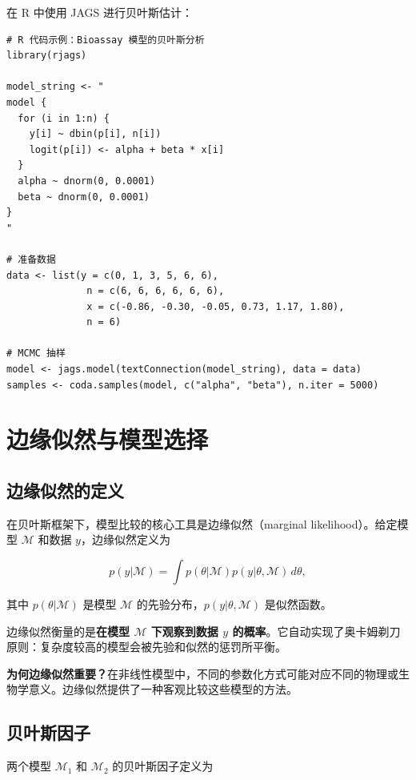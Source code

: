 在 R 中使用 JAGS 进行贝叶斯估计：

\begin{verbatim}
# R 代码示例：Bioassay 模型的贝叶斯分析
library(rjags)

model_string <- "
model {
  for (i in 1:n) {
    y[i] ~ dbin(p[i], n[i])
    logit(p[i]) <- alpha + beta * x[i]
  }
  alpha ~ dnorm(0, 0.0001)
  beta ~ dnorm(0, 0.0001)
}
"

# 准备数据
data <- list(y = c(0, 1, 3, 5, 6, 6),
              n = c(6, 6, 6, 6, 6, 6),
              x = c(-0.86, -0.30, -0.05, 0.73, 1.17, 1.80),
              n = 6)

# MCMC 抽样
model <- jags.model(textConnection(model_string), data = data)
samples <- coda.samples(model, c("alpha", "beta"), n.iter = 5000)
\end{verbatim}

\section{边缘似然与模型选择}\label{sec:marginal-likelihood}

\subsection{边缘似然的定义}

在贝叶斯框架下，模型比较的核心工具是边缘似然（marginal likelihood）。给定模型 $\mathcal{M}$ 和数据 $y$，边缘似然定义为

\begin{equation}
p(y | \mathcal{M}) = \int p(\theta | \mathcal{M}) p(y | \theta, \mathcal{M}) \, d\theta, \label{eq:marginal-likelihood}
\end{equation}

其中 $p(\theta | \mathcal{M})$ 是模型 $\mathcal{M}$ 的先验分布，$p(y | \theta, \mathcal{M})$ 是似然函数。

边缘似然衡量的是\textbf{在模型 $\mathcal{M}$ 下观察到数据 $y$ 的概率}。它自动实现了奥卡姆剃刀原则：复杂度较高的模型会被先验和似然的惩罚所平衡。

\textbf{为何边缘似然重要？}在非线性模型中，不同的参数化方式可能对应不同的物理或生物学意义。边缘似然提供了一种客观比较这些模型的方法。

\subsection{贝叶斯因子}

两个模型 $\mathcal{M}_1$ 和 $\mathcal{M}_2$ 的贝叶斯因子定义为

